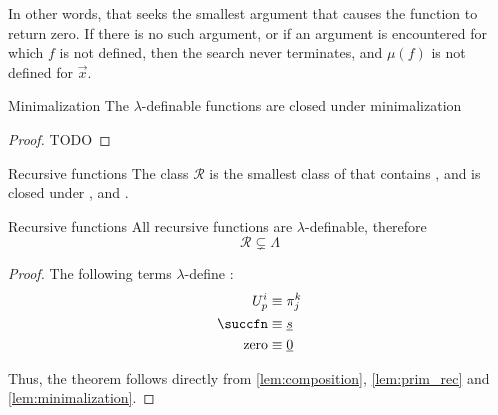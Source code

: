 \documentclass[a4paper, 12pt]{report}
\begin{document}
    In other words, that  seeks the smallest argument that causes the function to return zero. If there is no such argument, or if an argument is encountered for which $f$ is not defined, then the search never terminates, and $\mu(f)$ is not defined for $\vec x$.

    \begin{framedlem}[label={lem:minimalization}]{Minimalization}
        The $\lambda$-definable functions are closed under minimalization
    \end{framedlem}

    \begin{proof}
        TODO
    \end{proof}

    \begin{frameddefn}{Recursive functions}
        The class $\mathcal R$ is the smallest class of  that contains , and is closed under ,  and .
    \end{frameddefn}

    \begin{framedthm}{Recursive functions}
        All recursive functions are $\lambda$-definable, therefore $$\mathcal R \subsetneq \Lambda$$
    \end{framedthm}

    \begin{proof}
        The following terms $\lambda$-define :
        \begin{equation*}
            \begin{split}
                U_p^i &\equiv \pi_j^k \\
                \succfn &\equiv \underline s \\
                \mathrm{zero} &\equiv \underline 0
            \end{split}
        \end{equation*}

        Thus, the theorem follows directly from \cref{lem:composition}, \cref{lem:prim_rec} and \cref{lem:minimalization}.
    \end{proof}
\end{document}
